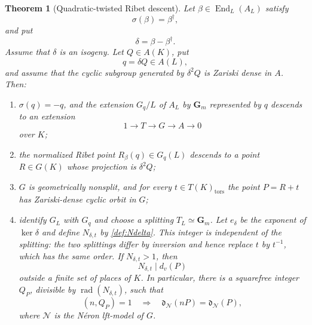 \documentclass[11pt,letterpaper,reqno]{amsart}
\newtheorem{theorem}{Theorem}[section]
\theoremstyle{definition}
\theoremstyle{remark}
\newcommand{\Gm}{\mathbf G_m}
\newcommand{\End}{\operatorname{End}}
\newcommand{\rad}{\operatorname{rad}}
\newcommand{\dd}{\mathfrak d}
\newcommand{\tors}{\mathrm{tors}}
\newcommand{\Ner}{\mathcal N}
\begin{document}
\begin{theorem}[Quadratic-twisted Ribet descent]
\label{thm:quadratic-descent}
Let $\beta\in\End_L(A_L)$ satisfy
\begin{equation}\label{eq:descent-beta}
 \sigma(\beta)=\beta^\dagger,
\end{equation}
and put
\[
 \delta=\beta-\beta^\dagger.
\]
Assume that $\delta$ is an isogeny.  Let $Q\in A(K)$, put
\[
 q=\delta Q\in A(L),
\]
and assume that the cyclic subgroup generated by $\delta^2Q$ is Zariski dense
in $A$.  Then:
\begin{enumerate}[label=\textup{(\roman*)}]
\item $\sigma(q)=-q$, and the extension $G_q/L$ of $A_L$ by $\Gm$
      represented by $q$ descends to an extension
\begin{equation}\label{eq:descent-extension}
 1\longrightarrow T\longrightarrow G\longrightarrow A\longrightarrow0
\end{equation}
      over $K$;
\item the normalized Ribet point $R_\beta(q)\in G_q(L)$ descends to a point
      $R\in G(K)$ whose projection is $\delta^2Q$;
\item $G$ is geometrically nonsplit, and for every $t\in T(K)_{\tors}$ the
      point $P=R+t$ has Zariski-dense cyclic orbit in $G$;
\item identify $G_L$ with $G_q$ and choose a splitting $T_L\simeq\Gm$.
      Let $e_\delta$ be the exponent of $\ker\delta$ and define
      $N_{\delta,t}$ by \cref{def:Ndelta}.  This integer is independent of the
      splitting: the two splittings differ by inversion and hence replace
      $t$ by $t^{-1}$, which has the same order.  If $N_{\delta,t}>1$, then
\[
 N_{\delta,t}\mid d_v(P)
\]
      outside a finite set of places of $K$.  In particular, there is a
      squarefree integer $Q_P$, divisible by $\rad(N_{\delta,t})$, such that
\begin{equation}\label{eq:descent-return-core}
 (n,Q_P)=1
 \quad\Longrightarrow\quad
 \dd_{\Ner}(nP)=\dd_{\Ner}(P),
\end{equation}
      where $\Ner$ is the N\'eron lft-model of $G$.
\end{enumerate}
\end{theorem}
\end{document}
